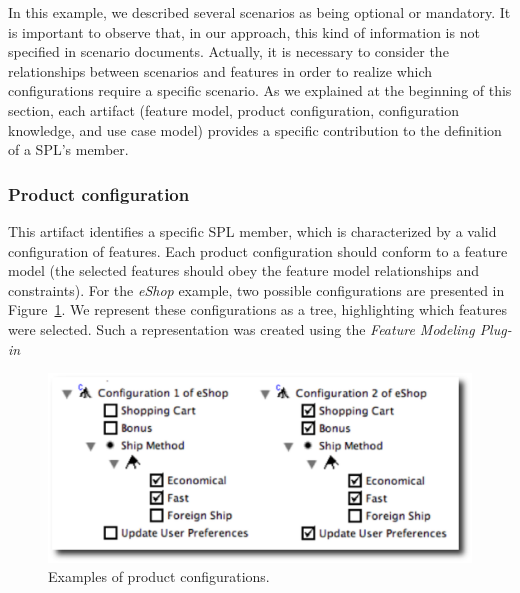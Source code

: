 In this example, we described several scenarios as being optional or
mandatory. It is important to observe that, in our approach, this kind of
information is not specified in scenario documents. Actually, it is necessary to
consider the relationships between scenarios and features in order to realize
which configurations require a specific scenario. As we explained at the
beginning of this section, each artifact (feature model, product configuration,
configuration knowledge, and use case model) provides a specific contribution to
the definition of a SPL's member.


\subsubsection{Product configuration}\label{subsub:pc}

This artifact identifies a specific SPL member, which is characterized by a valid
configuration of features. Each product configuration should conform to a feature
model (the selected features should obey the feature model relationships and
constraints). For the \emph{eShop} example, two possible configurations are
presented in Figure~\ref{fig:product-config-01-02}. We represent these configurations as a
tree, highlighting which features were selected. Such a representation was
created using the \emph{Feature Modeling Plug-in}~\cite{Czarnecki:2004aa}


 \begin{figure}[h]
 \begin{center}
  \includegraphics[scale=0.33]{img/pc-04.eps}
   \caption{Examples of product configurations.}
  \label{fig:product-config-01-02}
  \end{center}
\end{figure}


